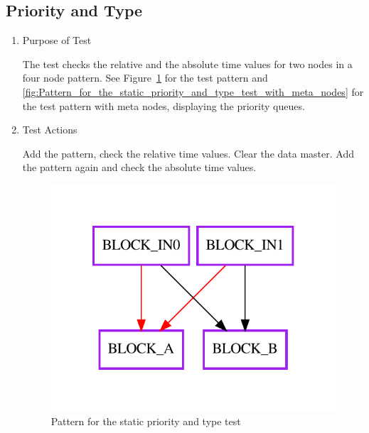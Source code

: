 \documentclass[12pt,a4paper]{report}
\begin{document}
\subsection{Priority and Type}
\begin{enumerate}
	\item Purpose of Test

The test checks the relative and the absolute time values for two nodes in a four node pattern. 
See Figure~\ref{fig:Pattern_for_the_static_priority_and_type_test} for the test pattern 
and \ref{fig:Pattern_for_the_static_priority_and_type_test_with_meta_nodes} for the test pattern with meta nodes, 
displaying the priority queues.
	\item Test Actions

	Add the pattern, check the relative time values. Clear the data master. Add the pattern again and check the absolute time values.
    \begin{figure}
        \centering 
        \includegraphics{TestPattern/static_prio_and_type.pdf}
        \caption{Pattern for the static priority and type test}
        \label{fig:Pattern_for_the_static_priority_and_type_test}
    \end{figure}
    \begin{figure}
        \centering 

\end{figure}
\end{enumerate}
\end{document}
